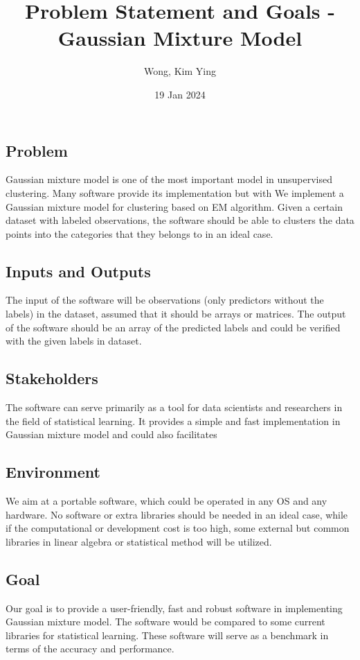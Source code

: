 \documentclass{article}
\title{Problem Statement and Goals -  Gaussian Mixture Model}
\author{Wong, Kim Ying}
\date{19 Jan 2024}
\begin{document}
\maketitle


\subsection{Problem}
Gaussian mixture model is one of the most important model in unsupervised clustering. Many software provide its implementation but with 
We implement a Gaussian mixture model for clustering based on EM algorithm. Given a certain dataset with labeled observations, the software should be able to clusters the data points into the categories that they belongs to in an ideal case. 
\subsection{Inputs and Outputs}
The input of the software will be observations (only predictors without the labels) in the dataset, assumed that it should be arrays or matrices. The output of the software should be an array of the predicted labels and could be verified with the given labels in dataset.

\subsection{Stakeholders}
The software can serve primarily as a tool for data scientists and researchers in the field of statistical learning. It provides a simple and fast implementation in Gaussian mixture model and could also facilitates  
\subsection{Environment}
We aim at a portable software, which could be operated in any OS and any hardware. No software or extra libraries should be needed in an ideal case, while if the computational or development cost is too high, some external but common libraries in linear algebra or statistical method will be utilized.
\subsection{Goal}
Our goal is to provide a user-friendly, fast and robust software in implementing Gaussian mixture model. The software would be compared to some current libraries for statistical learning. These software will serve as a benchmark in terms of the accuracy and performance.
\end{document}
